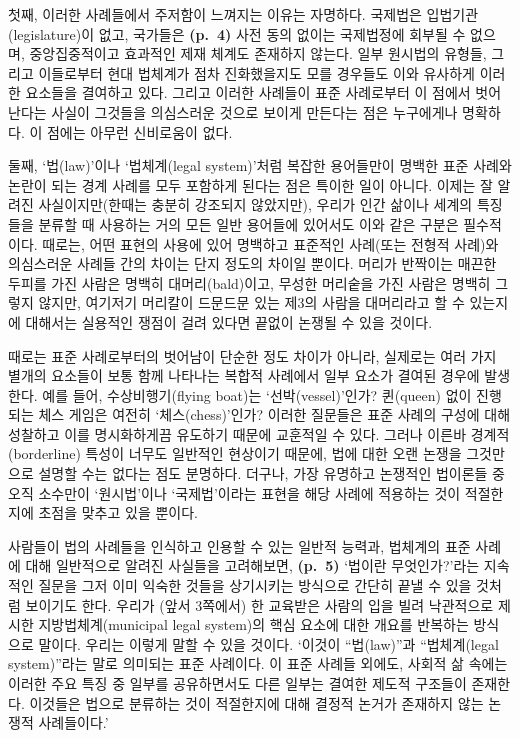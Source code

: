 \documentclass[12pt, oneside]{book}  %
\begin{document}
첫째, 이러한 사례들에서 주저함이 느껴지는 이유는 자명하다. 국제법은
입법기관(legislature)이 없고, 국가들은 \textbf{(p.~4)} 사전 동의 없이는
국제법정에 회부될 수 없으며, 중앙집중적이고 효과적인 제재 체계도
존재하지 않는다. 일부 원시법의 유형들, 그리고 이들로부터 현대 법체계가
점차 진화했을지도 모를 경우들도 이와 유사하게 이러한 요소들을 결여하고
있다. 그리고 이러한 사례들이 표준 사례로부터 이 점에서 벗어난다는 사실이
그것들을 의심스러운 것으로 보이게 만든다는 점은 누구에게나 명확하다. 이
점에는 아무런 신비로움이 없다.

둘째, `법(law)'이나 `법체계(legal system)'처럼 복잡한 용어들만이 명백한
표준 사례와 논란이 되는 경계 사례를 모두 포함하게 된다는 점은 특이한
일이 아니다. 이제는 잘 알려진 사실이지만(한때는 충분히 강조되지
않았지만), 우리가 인간 삶이나 세계의 특징들을 분류할 때 사용하는 거의
모든 일반 용어들에 있어서도 이와 같은 구분은 필수적이다. 때로는, 어떤
표현의 사용에 있어 명백하고 표준적인 사례(또는 전형적 사례)와 의심스러운
사례들 간의 차이는 단지 정도의 차이일 뿐이다. 머리가 반짝이는 매끈한
두피를 가진 사람은 명백히 대머리(bald)이고, 무성한 머리숱을 가진 사람은
명백히 그렇지 않지만, 여기저기 머리칼이 드문드문 있는 제3의 사람을
대머리라고 할 수 있는지에 대해서는 실용적인 쟁점이 걸려 있다면 끝없이
논쟁될 수 있을 것이다.

때로는 표준 사례로부터의 벗어남이 단순한 정도 차이가 아니라, 실제로는
여러 가지 별개의 요소들이 보통 함께 나타나는 복합적 사례에서 일부 요소가
결여된 경우에 발생한다. 예를 들어, 수상비행기(flying boat)는
`선박(vessel)'인가? 퀸(queen) 없이 진행되는 체스 게임은 여전히
`체스(chess)'인가? 이러한 질문들은 표준 사례의 구성에 대해 성찰하고 이를
명시화하게끔 유도하기 때문에 교훈적일 수 있다. 그러나 이른바
경계적(borderline) 특성이 너무도 일반적인 현상이기 때문에, 법에 대한
오랜 논쟁을 그것만으로 설명할 수는 없다는 점도 분명하다. 더구나, 가장
유명하고 논쟁적인 법이론들 중 오직 소수만이 `원시법'이나 `국제법'이라는
표현을 해당 사례에 적용하는 것이 적절한지에 초점을 맞추고 있을 뿐이다.

사람들이 법의 사례들을 인식하고 인용할 수 있는 일반적 능력과, 법체계의
표준 사례에 대해 일반적으로 알려진 사실들을 고려해보면, \textbf{(p.~5)}
`법이란 무엇인가?'라는 지속적인 질문을 그저 이미 익숙한 것들을
상기시키는 방식으로 간단히 끝낼 수 있을 것처럼 보이기도 한다. 우리가
(앞서 3쪽에서) 한 교육받은 사람의 입을 빌려 낙관적으로 제시한
지방법체계(municipal legal system)의 핵심 요소에 대한 개요를 반복하는
방식으로 말이다. 우리는 이렇게 말할 수 있을 것이다. `이것이
``법(law)''과 ``법체계(legal system)''라는 말로 의미되는 표준 사례이다.
이 표준 사례들 외에도, 사회적 삶 속에는 이러한 주요 특징 중 일부를
공유하면서도 다른 일부는 결여한 제도적 구조들이 존재한다. 이것들은
법으로 분류하는 것이 적절한지에 대해 결정적 논거가 존재하지 않는 논쟁적
사례들이다.'
\end{document}
